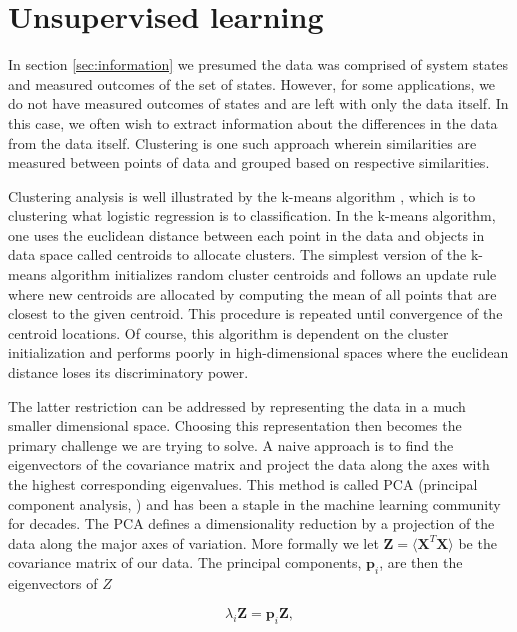 \section{Unsupervised learning}\label{sec:unsupervised_learning}

In section \ref{sec:information} we presumed the data was comprised of system states and measured outcomes of the set of states. However, for some applications, we do not have measured outcomes of states and are left with only the data itself. In this case, we often wish to extract information about the differences in the data from the data itself. Clustering is one such approach wherein similarities are measured between points of data and grouped based on respective similarities.

Clustering analysis is well illustrated by the k-means algorithm \cite{Neyman1967}, which is to clustering what logistic regression is to classification.  In the k-means algorithm, one uses the euclidean distance between each point in the data and objects in data space called centroids to allocate clusters. The simplest version of the k-means algorithm initializes random cluster centroids and follows an update rule where new centroids are allocated by computing the mean of all points that are closest to the given centroid. This procedure is repeated until convergence of the centroid locations. Of course, this algorithm is dependent on the cluster initialization and performs poorly in high-dimensional spaces where the euclidean distance loses its discriminatory power. 

The latter restriction can be addressed by representing the data in a much smaller dimensional space. Choosing this representation then becomes the primary challenge we are trying to solve. A naive approach is to find the eigenvectors of the covariance matrix and project the data along the axes with the highest corresponding eigenvalues. This method is called PCA (principal component analysis, \cite{Marsland2009}) and has been a staple in the machine learning community for decades. The PCA defines a dimensionality reduction by a projection of the data along the major axes of variation. More formally we let $\mathbf{Z} = \langle \mathbf{X}^T\mathbf{X}\rangle$ be the covariance matrix of our data. The principal components, $\mathbf{p}_i$, are then the eigenvectors of $Z$ 

\begin{equation}\label{eq:pca}
\lambda_i \mathbf{Z} = \mathbf{p}_i \mathbf{Z},
\end{equation}

